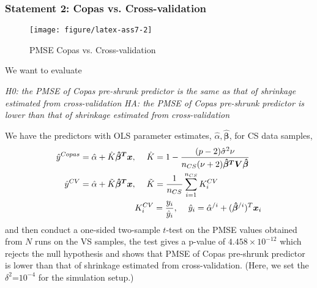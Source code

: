 \documentclass{article}\usepackage{graphicx, color}
\makeatletter
\def\maxwidth{ %
  \ifdim\Gin@nat@width>\linewidth
    \linewidth
  \else
    \Gin@nat@width
  \fi
}
\newenvironment{knitrout}{}{} %
\makeatother
\begin{document}
\subsubsection*{Statement 2: Copas vs. Cross-validation}
\begin{knitrout}
\color{fgcolor}\begin{figure}[]


{\centering \texttt{[image: figure/latex-ass7-2]} 

}

\caption[PMSE Copas vs]{PMSE Copas vs. Cross-validation\label{fig:ass7-2}}
\end{figure}


\end{knitrout}


\hspace{12 pt}  We want to evaluate


\hspace{12 pt} \textit{H0: the PMSE of Copas pre-shrunk predictor is
  the same as that of shrinkage estimated from cross-validation} \newline
\vspace{2 pt}
\hspace{24 pt} \textit{HA: the PMSE of Copas pre-shrunk predictor is
  lower than that of shrinkage estimated from cross-validation} \newline


We have the predictors with OLS parameter estimates, $\hat{\alpha},
\bm{\hat{\beta}}$, for CS data samples,
\begin{displaymath}
\begin{split}
\hat{y}^{Copas} &= \hat{\alpha} + \hat{K}\bm{\hat{\beta}^Tx},
\hspace{12 pt} \hat{K} = 1 -\frac{(p-2)\hat{\sigma}^2\nu}{n_{CS}(\nu+2)\bm{\hat{\beta}^TV\hat{\beta}}}\\
\hat{y}^{CV} &= \hat{\alpha} + \tilde{K}\bm{\hat{\beta}^Tx},
\hspace{12 pt} \tilde{K} = \frac{1}{n_{CS}} \sum_{i=1}^{n_{CS}}K^{CV}_i\\
&\hspace{64 pt} K^{CV}_i = \frac{y_i}{\hat{y}_i},
\hspace{12 pt} \hat{y}_i = \hat{\alpha}^{/i} + (\bm{\hat{\beta}}^{/i})^T\bm{x}_i\\
\end{split}
\end{displaymath}
and then conduct a one-sided two-sample $t$-test on the PMSE values obtained
from $N$ runs on the VS samples, the test gives a p-value of 
\ensuremath{4.458\times 10^{-12}}
which rejects the null hypothesis and shows that PMSE of Copas
pre-shrunk predictor is lower than that of shrinkage estimated from cross-validation.
(Here, we set the $\delta^2$=\ensuremath{10^{-4}} for the simulation setup.)
\end{document}
